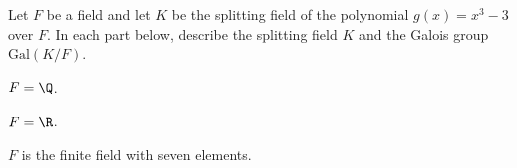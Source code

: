 Let $F$ be a field and let $K$ be the splitting field of the
polynomial $g(x)=x^3-3$ over $F$. In each part below, describe
the splitting field $K$ and the Galois group $\mathrm{Gal}(K/F)$.
\begin{alist}
\item $F=\Q$.
\item $F=\R$.
\item $F$ is the finite field with seven elements.
\end{alist}
